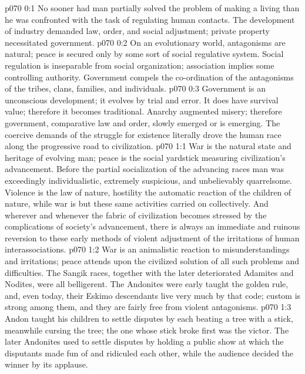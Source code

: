 \author{Melchizedek}
\vs p070 0:1 No sooner had man partially solved the problem of making a living than he was confronted with the task of regulating human contacts. The development of industry demanded law, order, and social adjustment; private property necessitated government.
\vs p070 0:2 On an evolutionary world, antagonisms are natural; peace is secured only by some sort of social regulative system. Social regulation is inseparable from social organization; association implies some controlling authority. Government compels the co\hyp{}ordination of the antagonisms of the tribes, clans, families, and individuals.\plusone
\vs p070 0:3 Government is an unconscious development; it evolves by trial and error. It does have survival value; therefore it becomes traditional. Anarchy augmented misery; therefore government, comparative law and order, slowly emerged or is emerging. The coercive demands of the struggle for existence literally drove the human race along the progressive road to civilization.
\vs p070 1:1 War is the natural state and heritage of evolving man; peace is the social yardstick measuring civilization’s advancement. Before the partial socialization of the advancing races man was exceedingly individualistic, extremely suspicious, and unbelievably quarrelsome. Violence is the law of nature, hostility the automatic reaction of the children of nature, while war is but these same activities carried on collectively. And wherever and whenever the fabric of civilization becomes stressed by the complications of society’s advancement, there is always an immediate and ruinous reversion to these early methods of violent adjustment of the irritations of human interassociations.
\vs p070 1:2 War is an animalistic reaction to misunderstandings and irritations; peace attends upon the civilized solution of all such problems and difficulties. The Sangik races, together with the later deteriorated Adamites and Nodites, were all belligerent. The Andonites were early taught the golden rule, and, even today, their Eskimo descendants live very much by that code; custom is strong among them, and they are fairly free from violent antagonisms.
\vs p070 1:3 Andon taught his children to settle disputes by each beating a tree with a stick, meanwhile cursing the tree; the one whose stick broke first was the victor. The later Andonites used to settle disputes by holding a public show at which the disputants made fun of and ridiculed each other, while the audience decided the winner by its applause.
